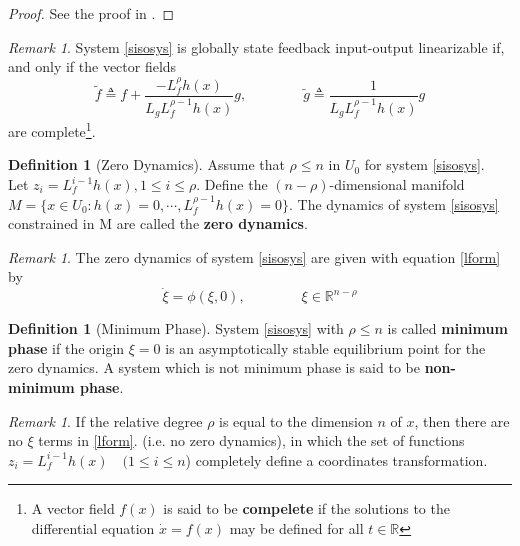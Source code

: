 \documentclass[11pt, a4paper, oneside, openany, reqno]{book}
\theoremstyle{definition}
\newtheorem{definition}[theorem]{Definition}
\theoremstyle{remark}
\newtheorem{remark}[theorem]{Remark}
\numberwithin{equation}{chapter} %
\newcommand{\R}{\ensuremath{{\mathbb R}}}
\begin{document}
\begin{proof}
	See the proof in \cite{marino}.
\end{proof}


\begin{remark} 
	System \eqref{sisosys} is globally state feedback input-output linearizable 
	if, and only if the vector fields
	\begin{equation} \label{vfield}
	\tilde{f} \triangleq f+\frac{-L_f^\rho h(x)}{L_g L_f^{\rho-1} h(x)}g,
	\qquad\qquad \tilde{g} \triangleq \frac{1}{L_g L_f^{\rho-1} h(x)}g
	\end{equation}
	are complete\footnote{A vector field $ f(x) $ is said to be \textbf{compelete} 
	if the solutions to the differential equation $ \dot{x}=f(x) $ 
	may be defined for all $ t \in \R $ }.
\end{remark}

\begin{definition}[Zero Dynamics]
	Assume that $\rho \leq n$ in $ U_0  $ for system \eqref{sisosys}.\\
	Let $ z_i = L_f^{i-1} h(x), 1 \leq i \leq \rho $. Define the $ (n-\rho) $-dimensional manifold 
	$ M=\lbrace x \in U_0 : h(x) =0,\cdots,L_f^{\rho-1}h(x)=0\rbrace $.
	The dynamics of system \eqref{sisosys} constrained in M are called the \textbf{zero dynamics}.
\end{definition}

\begin{remark}
	The zero dynamics of system \eqref{sisosys} are given with equation \eqref{lform} by 
	\begin{equation}
	\dot{\xi} = \phi(\xi,0) , \qquad\qquad \xi \in \R^{n-\rho}
	\end{equation}
\end{remark}

\begin{definition}[Minimum Phase]
	System \eqref{sisosys} with $ \rho \leq n $ is called \textbf{minimum phase} 
	if the origin $ \xi=0 $	is an asymptotically stable equilibrium point for the zero dynamics. 
	A system which is not minimum phase
	is said to be \textbf{non-minimum phase}.
\end{definition}

\begin{remark}
	If the relative degree $ \rho $ is equal to the dimension $ n $ of $ x $, 
	then there are no $ \xi $ terms in \eqref{lform}. (i.e.  no zero dynamics), 
	in which the set of functions $ z_i = L_f^{i-1} h(x) \quad (1 \leq i \leq n$)  
	completely define a coordinates transformation.
\end{remark}
\end{document}
